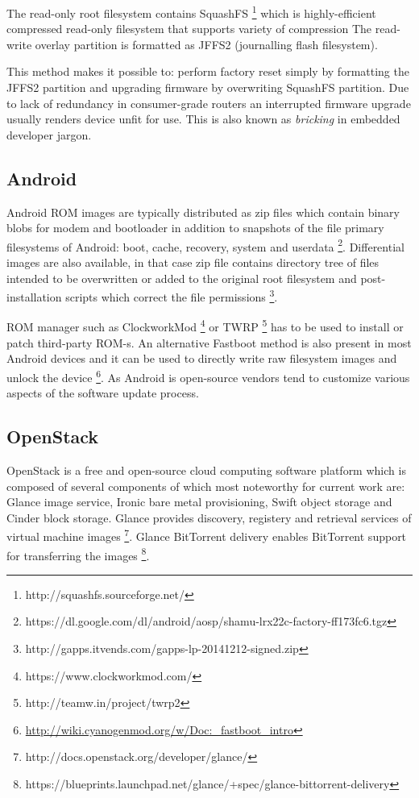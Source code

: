 \documentclass{article}
\begin{document}
The read-only root filesystem contains SquashFS
\footnote{http://squashfs.sourceforge.net/}
which is highly-efficient compressed read-only filesystem that
supports variety of compression The read-write overlay partition
is formatted as JFFS2 (journalling flash filesystem).

This method makes it possible to: perform factory reset simply by
formatting the JFFS2 partition and upgrading firmware by overwriting
SquashFS partition. Due to lack of redundancy in consumer-grade routers
an interrupted firmware upgrade usually renders device unfit for use. This is also known as \emph{bricking} in embedded developer jargon.


\subsection{Android}

Android ROM images are typically distributed as zip files which contain 
binary blobs for modem and bootloader in addition to snapshots of the
file primary filesystems of Android: boot, cache, recovery, system and
userdata
\footnote{https://dl.google.com/dl/android/aosp/shamu-lrx22c-factory-ff173fc6.tgz}.
Differential images are also available, in that case zip file contains
directory tree of files intended to be overwritten or added to the original
root filesystem and post-installation scripts which correct the file permissions
\footnote{http://gapps.itvends.com/gapps-lp-20141212-signed.zip}.

ROM manager such as ClockworkMod \footnote{https://www.clockworkmod.com/} or
TWRP \footnote{http://teamw.in/project/twrp2} has to be used to install or patch
third-party ROM-s.
An alternative Fastboot method is also present in most
Android devices and it can be used to directly write raw filesystem images and
unlock the device
\footnote{\url{http://wiki.cyanogenmod.org/w/Doc:_fastboot_intro}}.
As Android is open-source vendors tend to customize various aspects
of the software update process.




\subsection{OpenStack}

OpenStack is a free and open-source cloud computing software platform
which is composed of several components of which most noteworthy for current work are:
Glance image service, Ironic bare metal provisioning,
Swift object storage and Cinder block storage.
Glance provides discovery, registery and retrieval services of virtual machine images
\footnote{http://docs.openstack.org/developer/glance/}.
Glance BitTorrent delivery enables BitTorrent support for transferring the images
\footnote{https://blueprints.launchpad.net/glance/+spec/glance-bittorrent-delivery}.
\end{document}
